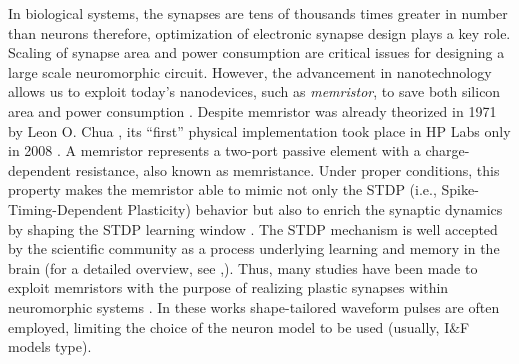 \documentclass[review]{elsarticle}
\begin{document}
 
In biological systems, the synapses are tens of thousands times greater in number than neurons therefore, optimization of electronic synapse design plays a key role. Scaling of synapse area and power consumption are critical issues for designing a large scale neuromorphic circuit. However, the advancement in nanotechnology allows us to exploit today's nanodevices, such as \emph{memristor}, to save both silicon area and power consumption \cite{Strukov2008}. Despite memristor was already theorized in 1971 by Leon O. Chua \cite{Chua1971}, its ``first'' physical  implementation took place in HP Labs only in 2008 \cite{Strukov2008}. A memristor represents a two-port passive element with a charge-dependent resistance, also known as memristance. Under proper conditions, this property makes the memristor able to mimic not only the STDP (i.e., Spike-Timing-Dependent Plasticity) behavior but also to enrich the synaptic dynamics by shaping the STDP learning window \cite{Serrano2013}. The STDP mechanism is well accepted by the scientific community as a process underlying learning and memory in the brain (for a detailed overview, see \cite{Bi1998},\cite{Markram2012}).
Thus, many studies have been made to exploit memristors with the purpose of realizing plastic synapses within neuromorphic systems \cite{ Serrano2013, ZamarrenoRamos2011, Indiveri2013, Perchin2014, Bill2014, Guo2014, He2014, Lecerf2014, Wu2015}. In these works shape-tailored waveform pulses are often employed, limiting the choice of the neuron model to be used (usually, I$\&$F \cite{Abbott1999} models type). 




 


\end{document}
